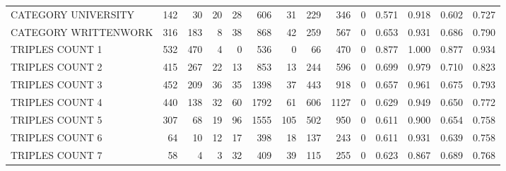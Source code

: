 \begin{tabular}{lrrrrrrrrrllll}
 CATEGORY UNIVERSITY      &             142 &            30 &              20 &              28 &             606 &   31 &  229 &  346 &    0 & 0.571 & 0.918 & 0.602 & 0.727 \\
 CATEGORY WRITTENWORK     &             316 &           183 &               8 &              38 &             868 &   42 &  259 &  567 &    0 & 0.653 & 0.931 & 0.686 & 0.790 \\
 TRIPLES COUNT 1          &             532 &           470 &               4 &               0 &             536 &    0 &   66 &  470 &    0 & 0.877 & 1.000 & 0.877 & 0.934 \\
 TRIPLES COUNT 2          &             415 &           267 &              22 &              13 &             853 &   13 &  244 &  596 &    0 & 0.699 & 0.979 & 0.710 & 0.823 \\
 TRIPLES COUNT 3          &             452 &           209 &              36 &              35 &            1398 &   37 &  443 &  918 &    0 & 0.657 & 0.961 & 0.675 & 0.793 \\
 TRIPLES COUNT 4          &             440 &           138 &              32 &              60 &            1792 &   61 &  606 & 1127 &    0 & 0.629 & 0.949 & 0.650 & 0.772 \\
 TRIPLES COUNT 5          &             307 &            68 &              19 &              96 &            1555 &  105 &  502 &  950 &    0 & 0.611 & 0.900 & 0.654 & 0.758 \\
 TRIPLES COUNT 6          &              64 &            10 &              12 &              17 &             398 &   18 &  137 &  243 &    0 & 0.611 & 0.931 & 0.639 & 0.758 \\
 TRIPLES COUNT 7          &              58 &             4 &               3 &              32 &             409 &   39 &  115 &  255 &    0 & 0.623 & 0.867 & 0.689 & 0.768 \\
\hline
\end{tabular}